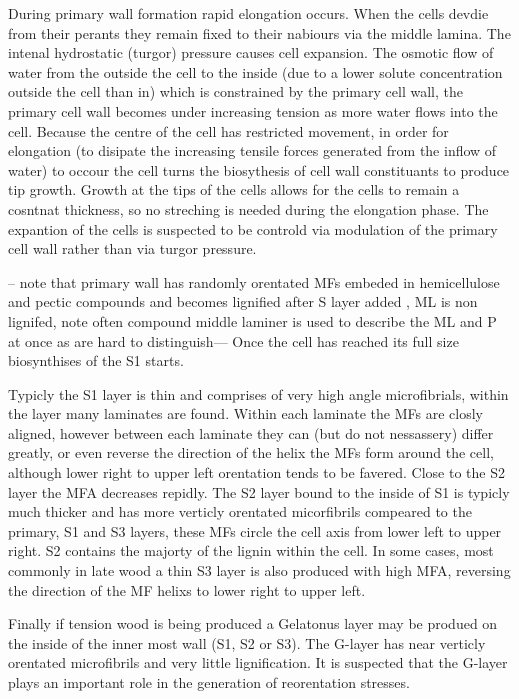 \documentclass{article}
\begin{document}
During primary wall formation rapid elongation occurs. When the cells devdie
from their perants they remain fixed to their nabiours via the middle lamina.
The intenal hydrostatic (turgor) pressure causes cell expansion. The osmotic flow of
water from the outside the cell to the inside (due to a lower solute concentration
outside the cell than in) which is constrained by the primary cell wall, the
primary cell wall becomes under increasing tension as more water flows into
the cell. Because the centre of the cell has restricted movement, in order for
elongation (to disipate the increasing tensile forces generated from the
inflow of water) to occour the cell turns the biosythesis of cell wall
constituants to produce tip growth. Growth at the tips of the cells allows for
the cells to remain a cosntnat thickness, so no streching is needed during the
elongation phase. The expantion of the cells is
suspected to be controld via modulation of the primary cell wall rather than via
turgor pressure.

-- note that primary wall has randomly orentated MFs embeded
in hemicellulose and pectic compounds and becomes lignified after S layer added
, ML is non lignifed, note often compound middle laminer is used to describe
the ML and P at once as are hard to distinguish--- Once the cell has reached its
full size biosynthises of the S1 starts.

Typicly the S1 layer is thin and comprises of very high angle microfibrials,
within the layer many laminates are found. Within each laminate the MFs are
closly aligned, however between each laminate they can (but do not nessassery)
differ greatly, or even reverse the direction of the helix the MFs form around
the cell, although lower right to upper left orentation tends to be favered.
Close to the S2 layer the MFA decreases repidly.
The S2 layer bound to the inside of S1 is typicly much thicker and has more
verticly orentated micorfibrils compeared to the primary, S1 and S3 layers, these MFs circle the
cell axis from lower left to upper right. S2 contains the majorty of the lignin
within the cell. In some cases, most commonly in late wood a thin S3 layer is
also produced with high MFA, reversing the direction of the MF helixs to lower
right to upper left.

Finally if tension wood is being produced a Gelatonus layer
may be produed on the inside of the inner most wall (S1, S2 or S3). The G-layer
has near verticly orentated microfibrils and very little lignification. It is suspected that the
G-layer plays an important role in the generation of reorentation stresses.
\end{document}
